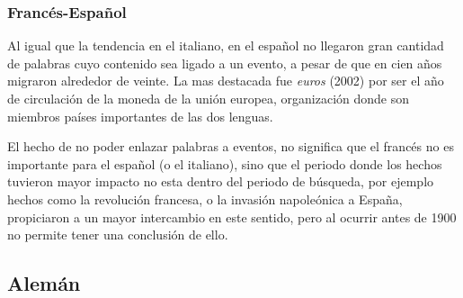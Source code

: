 \subsubsection*{Francés-Español}%

Al igual que la tendencia en el italiano, en el español no llegaron gran cantidad de palabras cuyo contenido sea ligado a un evento, a pesar de que en cien años migraron alrededor de veinte. La mas destacada fue \textit{euros} (2002) por ser el año de circulación de la moneda de la unión europea, organización donde son miembros países importantes de las dos lenguas. 

El hecho de no poder enlazar palabras a eventos, no significa que el francés no es importante para el español (o el italiano), sino que el periodo donde los hechos tuvieron mayor impacto no esta dentro del periodo de búsqueda,  por ejemplo hechos como la revolución francesa, o la invasión napoleónica a España, propiciaron a un mayor intercambio en este sentido, pero al ocurrir antes de 1900 no permite tener una conclusión de ello. 


\subsection{Alemán}%

